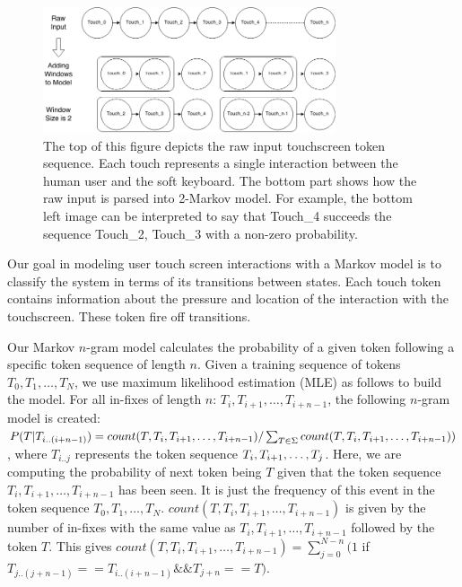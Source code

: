 \documentclass{acm_proc_article-sp}
\begin{document}
\begin{figure}
\centering
\includegraphics[width=3.4in]{figures/Markov_model_building.png}
\caption{The top of this figure depicts the raw input touchscreen token sequence. Each touch represents a single interaction between the human user and the soft keyboard. The bottom part shows how the raw input is parsed into 2-Markov model. For example, the bottom left image can be interpreted to say that Touch\_4 succeeds the sequence Touch\_2, Touch\_3 with a non-zero probability.}
\label{fig:markov_model_building}
\end{figure}


Our goal in modeling user touch screen interactions with a Markov model is to classify the system in terms of its transitions between states. 
Each touch token contains information about the pressure and location of the interaction with the touchscreen.
These token fire off transitions.


Our Markov $n$-gram model calculates the probability of a given token following a specific 
token sequence of length $n$. Given a training sequence of tokens $T_0, T_1, \dots , T_N$,
we use maximum likelihood estimation (MLE) as follows to build the model. For all in-fixes of
length $n$: $T_i, T_{i+1}, \dots , T_{i+n-1}$, the following $n$-gram model is created:
$P(T | T_{i..(i+n-1)}) =  count(T, T_i, T_{i+1}, \dots , T_{i+n-1})/\sum_{T \in \Sigma} count(
T, T_i, T_{i+1}, \dots , \\T_{i+n-1}))$, where $T_{i..j}$ represents the
token sequence $T_i, T_{i+\\1}, \dots, T_j$. Here, we are computing the probability of next token being $T$
given that the token sequence $T_i, T_{i+1}, \dots , T_{i+n-1}$ has been seen. It is just the
frequency of this event in the token sequence $T_0, T_1, \dots , T_N$.
$count(T, T_i, T_{i+1}, \dots , T_{i+n-1})$ is given by the number of in-fixes with the same value as
$T_i, T_{i+1}, \dots , T_{i+n-1}$ followed by the token $T$. This gives 
$count(T, T_i, T_{i+1}, \dots , T_{i+n-1}) = \sum_{j=0}^{N-n}(1$ if $T_{j..(j+n-1)} == T_{i..(i+n-1)} \&\&
T_{j+n} == T)$.
\end{document}
